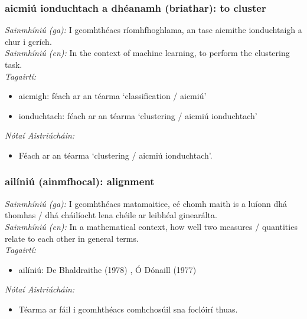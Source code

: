 \subsubsection*{aicmiú ionduchtach a dhéanamh (briathar): to cluster}
 \noindent \textit{Sainmhíniú (ga):} I gcomhthéacs ríomhfhoghlama, an tasc aicmithe ionduchtaigh a chur i gcrích.
\\
 \noindent \textit{Sainmhíniú (en):} In the context of machine learning, to perform the clustering task.
\\
 \noindent \textit{Tagairtí:}
\begin{itemize}
	\item aicmigh: féach ar an téarma `classification / aicmiú'
	\item ionduchtach: féach ar an téarma `clustering / aicmiú ionduchtach'
\end{itemize}

 \noindent \textit{Nótaí Aistriúcháin:}
\begin{itemize}
	\item Féach ar an téarma `clustering / aicmiú ionduchtach'.
\end{itemize}


\subsubsection*{ailíniú (ainmfhocal): alignment}
 \noindent \textit{Sainmhíniú (ga):} I gcomhthéacs matamaitice, cé chomh maith is a luíonn dhá thomhas / dhá cháilíocht lena chéile ar leibhéal ginearálta.
\\
 \noindent \textit{Sainmhíniú (en):} In a mathematical context, how well two measures / quantities relate to each other in general terms.
\\
 \noindent \textit{Tagairtí:}
\begin{itemize}
	\item ailíniú: De Bhaldraithe (1978) \cite{de-bhaldraithe}, Ó Dónaill (1977) \cite{odonaill}
\end{itemize}

 \noindent \textit{Nótaí Aistriúcháin:}
\begin{itemize}
	\item Téarma ar fáil i gcomhthéacs comhchosúil sna foclóirí thuas.
\end{itemize}


